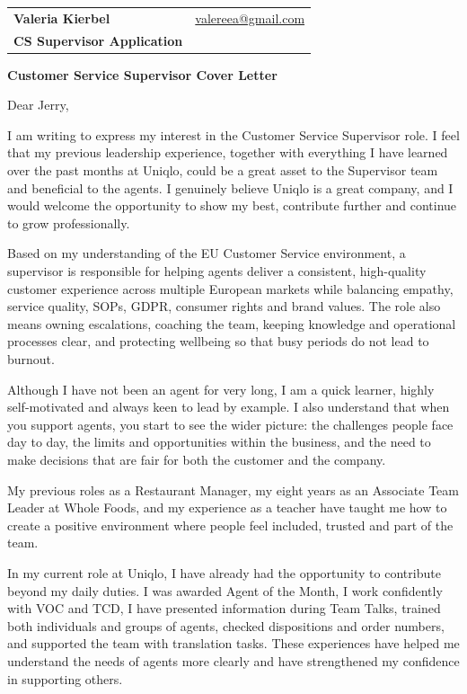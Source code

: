 \documentclass[10pt,a4paper]{article}
\makeatletter
\newcommand{\header}{
  \begin{tabularx}{\textwidth}{@{}X r@{}}
    {\fontsize{24}{27}\selectfont\bfseries\color{ink}Valeria Kierbel} &
    {\small\color{muted}\href{mailto:valereea@gmail.com}{valereea@gmail.com}}\\[-1pt]
    {\small\color{accent}\textbf{CS Supervisor Application}} & {}
  \end{tabularx}
  \vspace{7pt}
  \noindent\makebox[\textwidth][l]{%
    {\color{accent}\rule{0.18\textwidth}{1.2pt}}%
    {\color{line}\rule{0.82\textwidth}{1.2pt}}%
  }
  \vspace{9pt}
}
\makeatother
\begin{document}
\color{ink}
\fontsize{10.15}{13.25}\selectfont

\header

{\large\bfseries\color{ink}Customer Service Supervisor Cover Letter}

\vspace{4pt}

Dear Jerry,

I am writing to express my interest in the Customer Service Supervisor role. I feel that my previous leadership experience, together with everything I have learned over the past months at Uniqlo, could be a great asset to the Supervisor team and beneficial to the agents. I genuinely believe Uniqlo is a great company, and I would welcome the opportunity to show my best, contribute further and continue to grow professionally.

Based on my understanding of the EU Customer Service environment, a supervisor is responsible for helping agents deliver a consistent, high-quality customer experience across multiple European markets while balancing empathy, service quality, SOPs, GDPR, consumer rights and brand values. The role also means owning escalations, coaching the team, keeping knowledge and operational processes clear, and protecting wellbeing so that busy periods do not lead to burnout.

Although I have not been an agent for very long, I am a quick learner, highly self-motivated and always keen to lead by example. I also understand that when you support agents, you start to see the wider picture: the challenges people face day to day, the limits and opportunities within the business, and the need to make decisions that are fair for both the customer and the company.

My previous roles as a Restaurant Manager, my eight years as an Associate Team Leader at Whole Foods, and my experience as a teacher have taught me how to create a positive environment where people feel included, trusted and part of the team.

In my current role at Uniqlo, I have already had the opportunity to contribute beyond my daily duties. I was awarded Agent of the Month, I work confidently with VOC and TCD, I have presented information during Team Talks, trained both individuals and groups of agents, checked dispositions and order numbers, and supported the team with translation tasks. These experiences have helped me understand the needs of agents more clearly and have strengthened my confidence in supporting others.
\end{document}
